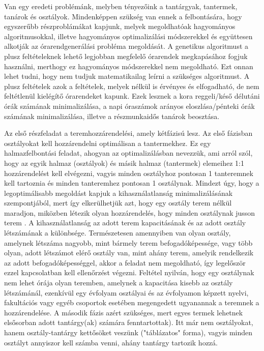 
Van egy eredeti problémánk, melyben tényezőink a tantárgyak, tantermek, tanárok és 
osztályok. Mindenképpen szükség van ennek a felbontására, hogy egyszerűbb részproblámákat kapjunk, melyek megoldhatóak hagyományos algoritmusokkal, illetve hagyományos optimalizálási módszerekkel és együttesen alkotják az órarendgenerálási probléma megoldását. A genetikus algoritmust a plusz feltételeknek lehető legjobban megfelelő órarendek megkapásához fogjuk használni, merthogy ez hagyományos módszerekkel nem megoldható. Ezt onnan lehet tudni, hogy nem tudjuk matematikailag leírni a szükséges algoritmust. A plusz feltételek azok a feltételek, melyek nélkül is érvényes és elfogadható, de nem feltétlenül kielégítő órarendeket kapunk. Ezek lesznek a kora reggeli/késő délutáni órák számának minimalizálása, a napi óraszámok arányos eloszlása/pénteki órák számának minimalizálása, illetve a részmunkaidős tanárok beosztása.


Az első részfeladat a teremhozzárendelési, amely kétfázisú lesz. Az első fázisban osztályokat kell hozzárendelni optimálisan a tantermekhez. Ez egy halmazfelbontási feladat, ahogyan az optimalizálásban nevezzük, ami arról szól, hogy az egyik halmaz (osztályok) és másik halmaz (tantermek) elemeihez 1:1 hozzárendelést kell elvégezni, vagyis minden osztályhoz pontosan 1 tanteremnek kell tartoznia és minden tanteremhez pontosan 1 osztálynak. Mindezt úgy, hogy a legoptimálisabb megoldást kapjuk a kihasználatlanság minimalizálásának szempontjából, mert így elkerülhetjük azt, hogy egy osztály terem nélkül maradjon, miközben létezik olyan hozzárendelés, hogy minden osztálynak jusson terem \cite{nagy1998operaciokutatas}. A kihasználatlanság az adott terem kapacitásának és az adott osztály létszámának a különbsége. Természetesen amennyiben van olyan osztály, amelynek létszáma nagyobb, mint bármely terem befogadóképessége, vagy több olyan, adott létszámot elérő osztály van, mint ahány terem, amelyik rendelkezik az adott befogadóképességgel, akkor a feladat nem megoldható, így legelőször ezzel kapcsolatban kell ellenőrzést végezni. Feltétel nyilván, hogy egy osztálynak nem lehet órája olyan teremben, amelynek a kapacitása kisebb az osztály létszámánál, ezenkívül egy évfolyam osztályai és az évfolyamon képzett nyelvi, fakultációs vagy egyéb csoportok esetében megengedett ugyanannak a teremnek a hozzárendelése. A második
fázis azért szükséges, mert egyes termek lehetnek elsősorban adott tantárgy(ak) számára fenntartottak). Itt már nem osztályokat, hanem osztály-tantárgy kettősöket veszünk ("táblázatos" forma), vagyis minden osztályt annyiszor kell számba venni, ahány tantárgy tartozik hozzá. 

